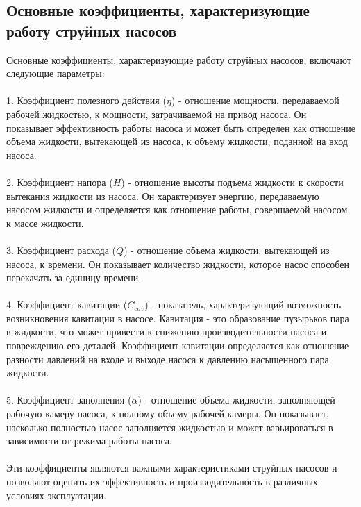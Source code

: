 \documentclass{article}
\begin{document}
\subsection{Основные коэффициенты, характеризующие работу струйных насосов}
Основные коэффициенты, характеризующие работу струйных насосов, включают следующие параметры:\\
~\\
1. Коэффициент полезного действия ($\eta$) - отношение мощности, передаваемой рабочей жидкостью, к мощности, затрачиваемой на привод насоса. Он показывает эффективность работы насоса и может быть определен как отношение объема жидкости, вытекающей из насоса, к объему жидкости, поданной на вход насоса.\\
~\\
2. Коэффициент напора ($H$) - отношение высоты подъема жидкости к скорости вытекания жидкости из насоса. Он характеризует энергию, передаваемую насосом жидкости и определяется как отношение работы, совершаемой насосом, к массе жидкости.\\
~\\
3. Коэффициент расхода ($Q$) - отношение объема жидкости, вытекающей из насоса, к времени. Он показывает количество жидкости, которое насос способен перекачать за единицу времени.\\
~\\
4. Коэффициент кавитации ($C_{cav}$) - показатель, характеризующий возможность возникновения кавитации в насосе. Кавитация - это образование пузырьков пара в жидкости, что может привести к снижению производительности насоса и повреждению его деталей. Коэффициент кавитации определяется как отношение разности давлений на входе и выходе насоса к давлению насыщенного пара жидкости.\\
~\\
5. Коэффициент заполнения ($\alpha$) - отношение объема жидкости, заполняющей рабочую камеру насоса, к полному объему рабочей камеры. Он показывает, насколько полностью насос заполняется жидкостью и может варьироваться в зависимости от режима работы насоса.\\
~\\
Эти коэффициенты являются важными характеристиками струйных насосов и позволяют оценить их эффективность и производительность в различных условиях эксплуатации.\\
~\\

\newpage
\end{document}
